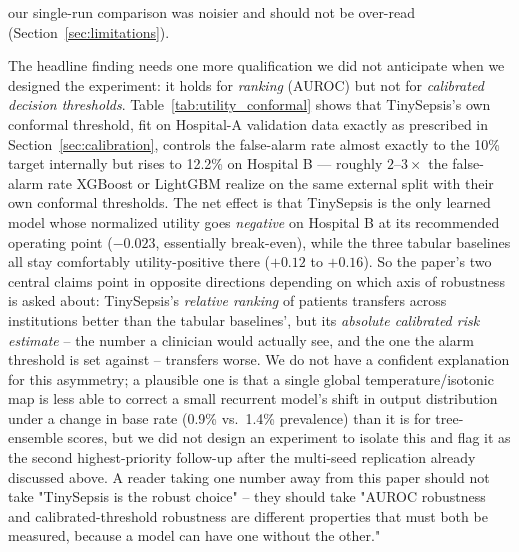 \documentclass[11pt]{article}
\begin{document}
our single-run comparison was noisier and should not be over-read (Section~\ref{sec:limitations}).

The headline finding needs one more qualification we did not anticipate when we designed the experiment: it holds for \emph{ranking} (AUROC) but not for \emph{calibrated decision thresholds}. Table~\ref{tab:utility_conformal} shows that TinySepsis's own conformal threshold, fit on Hospital-A validation data exactly as prescribed in Section~\ref{sec:calibration}, controls the false-alarm rate almost exactly to the 10\% target internally but rises to 12.2\% on Hospital B --- roughly $2$--$3\times$ the false-alarm rate XGBoost or LightGBM realize on the same external split with their own conformal thresholds. The net effect is that TinySepsis is the only learned model whose normalized utility goes \emph{negative} on Hospital B at its recommended operating point ($-0.023$, essentially break-even), while the three tabular baselines all stay comfortably utility-positive there ($+0.12$ to $+0.16$). So the paper's two central claims point in opposite directions depending on which axis of robustness is asked about: TinySepsis's \emph{relative ranking} of patients transfers across institutions better than the tabular baselines', but its \emph{absolute calibrated risk estimate} -- the number a clinician would actually see, and the one the alarm threshold is set against -- transfers worse. We do not have a confident explanation for this asymmetry; a plausible one is that a single global temperature/isotonic map is less able to correct a small recurrent model's shift in output distribution under a change in base rate (0.9\% vs.\ 1.4\% prevalence) than it is for tree-ensemble scores, but we did not design an experiment to isolate this and flag it as the second highest-priority follow-up after the multi-seed replication already discussed above. A reader taking one number away from this paper should not take "TinySepsis is the robust choice" -- they should take "AUROC robustness and calibrated-threshold robustness are different properties that must both be measured, because a model can have one without the other."
\end{document}
